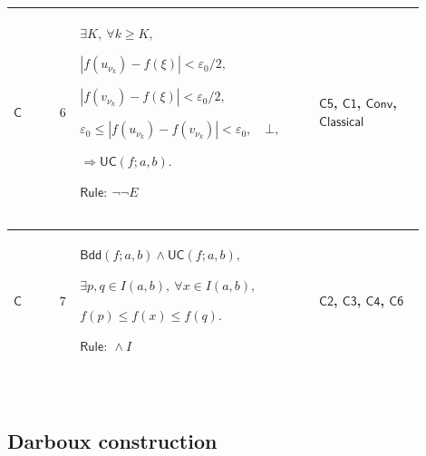 \documentclass[12pt,reqno]{amsart}
\theoremstyle{blueplain}
\numberwithin{equation}{section}
\begin{document}
{\scriptsize \setlength{\parskip}{0pt}\nointerlineskip
\noindent 
\begin{tabular}{|@{}>{\centering\arraybackslash}m{0.10658\linewidth}|>{\centering\arraybackslash}m{0.03553\linewidth}|>{\centering\arraybackslash}m{0.52105\linewidth}|>{\centering\arraybackslash}m{0.23684\linewidth}|}
\hline
\hypertarget{proof:C6}{$\displaystyle \mathsf{C}$} & $\displaystyle 6$ & $%
\displaystyle \exists K,\ \forall k\ge K,$\par$\displaystyle %
|f(u_{\nu_k})-f(\xi)|<\varepsilon_0/2,$\par$\displaystyle %
|f(v_{\nu_k})-f(\xi)|<\varepsilon_0/2,$\par$\displaystyle %
\varepsilon_0\le|f(u_{\nu_k})-f(v_{\nu_k})|<\varepsilon_0,\quad\bot,$\par$%
\displaystyle \Rightarrow\mathsf{UC}(f;a,b).$\par$\displaystyle \mathsf{Rule}%
:\ \neg\neg E$ & \hyperlink{proof:C5}{$\displaystyle \mathsf{C5}$}, 
\hyperlink{proof:C1}{$\displaystyle \mathsf{C1}$}, \hyperlink{def:Conv}{$%
\displaystyle \mathsf{Conv}$}, \hyperlink{ax:Classical}{$\displaystyle 
\mathsf{Classical}$} \\ \hline
\end{tabular}%
}

{\scriptsize \setlength{\parskip}{0pt}\nointerlineskip
\noindent 
\begin{tabular}{|@{}>{\centering\arraybackslash}m{0.10658\linewidth}|>{\centering\arraybackslash}m{0.03553\linewidth}|>{\centering\arraybackslash}m{0.52105\linewidth}|>{\centering\arraybackslash}m{0.23684\linewidth}|}
\hline
\hypertarget{proof:C7}{$\displaystyle \mathsf{C}$} & $\displaystyle 7$ & $%
\displaystyle \mathsf{Bdd}(f;a,b)\land\mathsf{UC}(f;a,b),$\par$\displaystyle %
\exists p,q\in I(a,b),\ \forall x\in I(a,b),$\par$\displaystyle f(p)\le
f(x)\le f(q).$\par$\displaystyle \mathsf{Rule}:\ \land I$ & \hyperlink{proof:C2}%
{$\displaystyle \mathsf{C2}$}, \hyperlink{proof:C3}{$\displaystyle \mathsf{C3%
}$}, \hyperlink{proof:C4}{$\displaystyle \mathsf{C4}$}, \hyperlink{proof:C6}{%
$\displaystyle \mathsf{C6}$} \\ \hline
\end{tabular}%
}

{\scriptsize \ }

\subsection{\protect\scriptsize Darboux construction}
\end{document}
